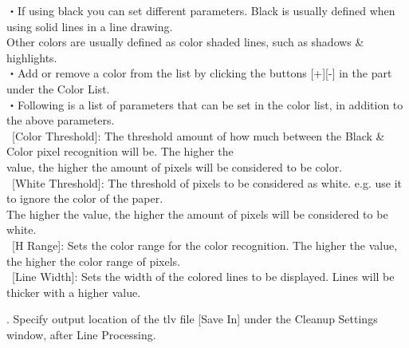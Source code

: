 \documentclass[a4paper,10pt]{article}
\begin{document}
\footnotesize
\noindent ・If using black you can set different parameters. Black is usually defined when using solid lines in a line drawing.\\
Other colors are usually defined as color shaded lines, such as shadows \& highlights.\\
・Add or remove a color from the list by clicking the buttons [+][-] in the part under the Color List.\\
・Following is a list of parameters that can be set in the color list, in addition to the above parameters.\\
\ [Color Threshold]: The threshold amount of how much between the Black \& Color pixel recognition will be. The higher the\\
value, the higher the amount of pixels will be considered to be color.\\
\ [White Threshold]: The threshold of pixels to be considered as white. e.g. use it to ignore the color of the paper.\\
The higher the value, the higher the amount of pixels will be considered to be white.\\
\ [H Range]: Sets the color range for the color recognition. The higher the value, the higher the color range of pixels.\\
\ [Line Width]: Sets the width of the colored lines to be displayed. Lines will be thicker with a higher value.\\
\par
\small
{}. Specify output location of the tlv file [Save In] under the Cleanup Settings window, after Line Processing.\\

\newpage 
\end{document}
